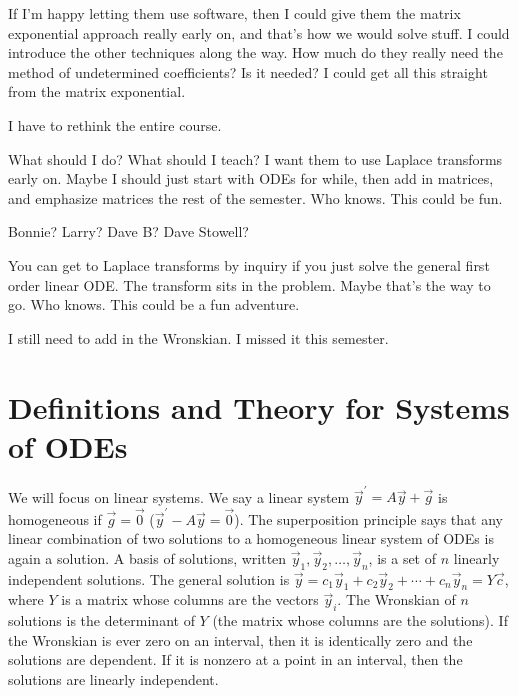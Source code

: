 {If I'm happy letting them use software, then I could give them the matrix exponential approach really early on, and that's how we would solve stuff.  I could introduce the other techniques along the way.  How much do they really need the method of undetermined coefficients?  Is it needed?  I could get all this straight from the matrix exponential.

I have to rethink the entire course.

What should I do?  What should I teach? I want them to use Laplace transforms early on. Maybe I should just start with ODEs for while, then add in matrices, and emphasize matrices the rest of the semester.  Who knows.  This could be fun.


Bonnie? Larry?  Dave B? Dave Stowell?

You can get to Laplace transforms by inquiry if you just solve the general first order linear ODE.  The transform sits in the problem.  Maybe that's the way to go.  Who knows.  This could be a fun adventure.


I still need to add in the Wronskian.  I missed it this semester.

\section{Definitions and Theory for Systems of ODEs}
We will focus on linear systems. We say a linear system $\vec y^\prime = A\vec y +\vec g$ is homogeneous if $\vec g =\vec 0$ ($\vec y^\prime -A\vec y =\vec 0$). The superposition principle says that any linear combination of two solutions to a homogeneous linear system of ODEs is again a solution.  A basis of solutions, written $\vec y_{1},\vec y_{2},\ldots, \vec y_{n}$, is a set of $n$ linearly independent solutions. The general solution is $\vec y = c_1\vec y_{1}+c_2\vec y_{2}+\cdots+c_n \vec y_{n} = Y\vec c$, where $Y$ is a matrix whose columns are the vectors $\vec y_{i}$.  The Wronskian of $n$ solutions is the determinant of $Y$ (the matrix whose columns are the solutions). If the Wronskian is ever zero on an interval, then it is identically zero and the solutions are dependent.  If it is nonzero at a point in an interval, then the solutions are linearly independent.

}